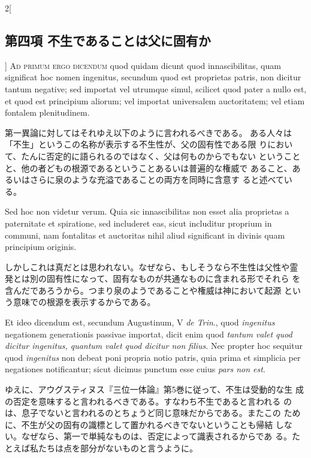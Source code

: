 \documentclass[paper=a4paper,fontsize=10pt,jafontsize=9pt,titlepage]{jlreq}
\begin{document}
\begin{paracol}{2}[\subsection{第四項 不生であることは父に固有か}]
{\scshape Ad primum ergo dicendum} quod quidam dicunt quod innascibilitas, quam
significat hoc nomen ingenitus, secundum quod est proprietas patris,
non dicitur tantum negative; sed importat vel utrumque simul, scilicet
quod pater a nullo est, et quod est principium aliorum; vel importat
universalem auctoritatem; vel etiam fontalem plenitudinem.


\switchcolumn


第一異論に対してはそれゆえ以下のように言われるべきである。
ある人々は「不生」というこの名称が表示する不生性が、父の固有性である限
 りにおいて、たんに否定的に語られるのではなく、父は何ものからでもない
 ということと、他の者どもの根源であるということあるいは普遍的な権威で
 あること、あるいはさらに泉のような充溢であることの両方を同時に含意す
 ると述べている。


\switchcolumn*


Sed hoc non
videtur verum. Quia sic innascibilitas non esset alia proprietas a
paternitate et spiratione, sed includeret eas, sicut includitur
proprium in communi, nam fontalitas et auctoritas nihil aliud
significant in divinis quam principium originis.


\switchcolumn


しかしこれは真だとは思われない。なぜなら、もしそうなら不生性は父性や霊
 発とは別の固有性になって、固有なものが共通なものに含まれる形でそれら
 を含んだであろうから。つまり泉のようであることや権威は神において起源
 という意味での根源を表示するからである。


\switchcolumn*


Et ideo dicendum est,
secundum Augustinum, V {\itshape de Trin}., quod {\itshape ingenitus} negationem
generationis passivae importat, dicit enim quod {\itshape tantum valet quod
dicitur ingenitus, quantum valet quod dicitur non filius}. Nec propter
hoc sequitur quod {\itshape ingenitus} non debeat poni propria notio patris, quia
prima et simplicia per negationes notificantur; sicut dicimus punctum
esse cuius {\itshape pars non est}.


\switchcolumn


ゆえに、アウグスティヌス『三位一体論』第5巻に従って、不生は受動的な生
 成の否定を意味すると言われるべきである。すなわち不生であると言われる
 のは、息子でないと言われるのとちょうど同じ意味だからである。またこの
 ために、不生が父の固有の識標として置かれるべきでないということも帰結
 しない。なぜなら、第一で単純なものは、否定によって識表されるからであ
 る。たとえば私たちは点を部分がないものと言うように。


\switchcolumn*[\subsection{ad.2}]



\end{paracol}
\end{document}
